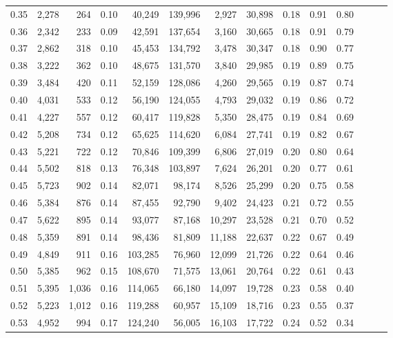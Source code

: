 \begin{tabular}{rrrrrrrrrrrrrr}
0.35 &  2,278 &    264 &  0.10 &   40,249 &  139,996 &   2,927 &  30,898 &  0.18 &  0.91 &      0.80 \\
0.36 &  2,342 &    233 &  0.09 &   42,591 &  137,654 &   3,160 &  30,665 &  0.18 &  0.91 &      0.79 \\
0.37 &  2,862 &    318 &  0.10 &   45,453 &  134,792 &   3,478 &  30,347 &  0.18 &  0.90 &      0.77 \\
0.38 &  3,222 &    362 &  0.10 &   48,675 &  131,570 &   3,840 &  29,985 &  0.19 &  0.89 &      0.75 \\
0.39 &  3,484 &    420 &  0.11 &   52,159 &  128,086 &   4,260 &  29,565 &  0.19 &  0.87 &      0.74 \\
0.40 &  4,031 &    533 &  0.12 &   56,190 &  124,055 &   4,793 &  29,032 &  0.19 &  0.86 &      0.72 \\
0.41 &  4,227 &    557 &  0.12 &   60,417 &  119,828 &   5,350 &  28,475 &  0.19 &  0.84 &      0.69 \\
0.42 &  5,208 &    734 &  0.12 &   65,625 &  114,620 &   6,084 &  27,741 &  0.19 &  0.82 &      0.67 \\
0.43 &  5,221 &    722 &  0.12 &   70,846 &  109,399 &   6,806 &  27,019 &  0.20 &  0.80 &      0.64 \\
0.44 &  5,502 &    818 &  0.13 &   76,348 &  103,897 &   7,624 &  26,201 &  0.20 &  0.77 &      0.61 \\
0.45 &  5,723 &    902 &  0.14 &   82,071 &   98,174 &   8,526 &  25,299 &  0.20 &  0.75 &      0.58 \\
0.46 &  5,384 &    876 &  0.14 &   87,455 &   92,790 &   9,402 &  24,423 &  0.21 &  0.72 &      0.55 \\
0.47 &  5,622 &    895 &  0.14 &   93,077 &   87,168 &  10,297 &  23,528 &  0.21 &  0.70 &      0.52 \\
0.48 &  5,359 &    891 &  0.14 &   98,436 &   81,809 &  11,188 &  22,637 &  0.22 &  0.67 &      0.49 \\
0.49 &  4,849 &    911 &  0.16 &  103,285 &   76,960 &  12,099 &  21,726 &  0.22 &  0.64 &      0.46 \\
0.50 &  5,385 &    962 &  0.15 &  108,670 &   71,575 &  13,061 &  20,764 &  0.22 &  0.61 &      0.43 \\
0.51 &  5,395 &  1,036 &  0.16 &  114,065 &   66,180 &  14,097 &  19,728 &  0.23 &  0.58 &      0.40 \\
0.52 &  5,223 &  1,012 &  0.16 &  119,288 &   60,957 &  15,109 &  18,716 &  0.23 &  0.55 &      0.37 \\
0.53 &  4,952 &    994 &  0.17 &  124,240 &   56,005 &  16,103 &  17,722 &  0.24 &  0.52 &      0.34 \\

\end{tabular}
